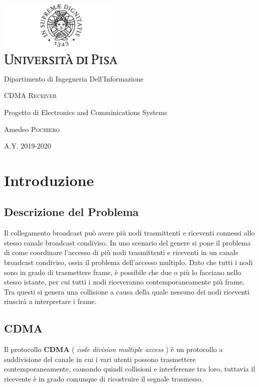 \documentclass[a4paper,12pt]{article}
\newcommand{\projectname}{CDMA Receiver}
\begin{document}

{
  \begin{titlepage}
  	\centering
  	\includegraphics[width=6cm]{img/unipi.pdf}\par
    \vspace{1.5cm}
    {\Large Dipartimento di Ingegneria Dell'Informazione \par}
  	\vspace{1.5cm}
  	{\huge\textsc{\projectname{}}\par}
    \vspace{0.5cm}
    {\Large Progetto di Electronics and Comminications Systems \par}
  	\vspace{2cm}
  	Amedeo \textsc{Pochiero}\par

  	\vfill

  	{\large A.Y. 2019-2020\par}
  \end{titlepage}
}


\clearpage
\tableofcontents
\clearpage
{}

\section{Introduzione} 
  \subsection{Descrizione del Problema}
  Il collegamento broadcast può avere più nodi trasmittenti e riceventi connessi allo stesso canale broadcast condiviso. 
  In uno scenario del genere si pone il problema di come coordinare l'accesso di più nodi trasmittenti e riceventi in un
  canale broadcast condiviso, ossia il problema dell'accesso multiplo. Dato che tutti i nodi sono in grado di trasmettere
  frame, è possibile che due o più lo facciano nello stesso istante, per cui tutti i nodi riceveranno contemporaneamente
  più frame. Tra questi si genera una collisione a causa della quale nessuno dei nodi riceventi riuscirà a interpretare
  i frame.
  \subsection{CDMA}
    Il protocollo \textbf{CDMA} ( \textit{code division multiple access} ) è un protocollo a suddivisione del canale in 
    cui i vari utenti possono trasmettere contemporaneamente, causando quindi collisioni e interferenze tra loro, tuttavia
    il ricevente è in grado comunque di ricostruire il segnale trasmesso. 
\end{document}
